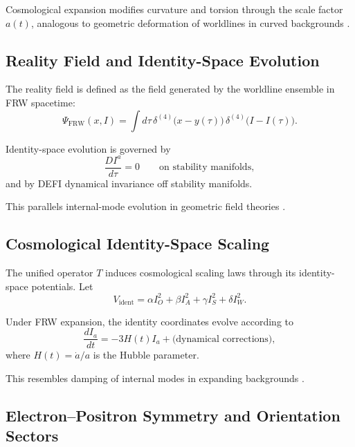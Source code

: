 \documentclass[aip,jmp,reprint,onecolumn,nofootinbib]{revtex4-2}
\begin{document}
Cosmological expansion modifies curvature and torsion through the scale factor $a(t)$, 
analogous to geometric deformation of worldlines in curved backgrounds 
\cite{WaldGR,Frankel}.

\subsection{Reality Field and Identity-Space Evolution}

The reality field is defined as the field generated by the worldline ensemble in FRW spacetime:
\begin{equation}
\Psi_{\mathrm{FRW}}(x,I)
=
\int d\tau \,
\delta^{(4)}\!\big(x - y(\tau)\big)
\,
\delta^{(4)}\!\big(I - I(\tau)\big).
\end{equation}

Identity-space evolution is governed by
\begin{equation}
\frac{D I^a}{d\tau}
=
0
\qquad \text{on stability manifolds},
\end{equation}
and by DEFI dynamical invariance \cite{DuttonDEFI2026} off stability manifolds.

This parallels internal-mode evolution in geometric field theories 
\cite{Nakahara,Frankel}.

\subsection{Cosmological Identity-Space Scaling}

The unified operator $T$ induces cosmological scaling laws through its identity-space 
potentials. Let
\begin{equation}
V_{\mathrm{ident}}
=
\alpha I_O^2
+
\beta I_A^2
+
\gamma I_S^2
+
\delta I_W^2.
\end{equation}

Under FRW expansion, the identity coordinates evolve according to
\begin{equation}
\frac{dI_a}{dt}
=
- 3 H(t) I_a
+
\text{(dynamical corrections)},
\end{equation}
where $H(t) = \dot{a}/a$ is the Hubble parameter.

This resembles damping of internal modes in expanding backgrounds 
\cite{MukhanovBook,Dodelson}.

\subsection{Electron–Positron Symmetry and Orientation Sectors}
\end{document}
